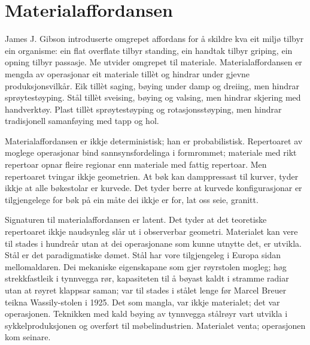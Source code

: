\section*{Materialaffordansen}


James J. Gibson introduserte omgrepet affordans for å skildre kva eit miljø tilbyr ein organisme: ein flat overflate tilbyr standing, ein handtak tilbyr griping, ein opning tilbyr passasje. Me utvider omgrepet til materiale. Materialaffordansen er mengda av operasjonar eit materiale tillèt og hindrar under gjevne produksjonsvilkår. Eik tillèt saging, bøying under damp og dreiing, men hindrar sprøytestøyping. Stål tillèt sveising, bøying og valsing, men hindrar skjering med handverktøy. Plast tillèt sprøytestøyping og rotasjonsstøyping, men hindrar tradisjonell samanføying med tapp og hol.

Materialaffordansen er ikkje deterministisk; han er probabilistisk. Repertoaret av moglege operasjonar bind sannsynsfordelinga i formrommet; materiale med rikt repertoar opnar fleire regionar enn materiale med fattig repertoar. Men repertoaret tvingar ikkje geometrien. At bøk kan damppressast til kurver, tyder ikkje at alle bøkestolar er kurvede. Det tyder berre at kurvede konfigurasjonar er tilgjengelege for bøk på ein måte dei ikkje er for, lat oss seie, granitt.

Signaturen til materialaffordansen er latent. Det tyder at det teoretiske repertoaret ikkje naudsynleg slår ut i observerbar geometri. Materialet kan vere til stades i hundreår utan at dei operasjonane som kunne utnytte det, er utvikla. Stål er det paradigmatiske dømet. Stål har vore tilgjengeleg i Europa sidan mellomaldaren. Dei mekaniske eigenskapane som gjer røyrstolen mogleg; høg strekkfastleik i tynnvegga rør, kapasiteten til å bøyast kaldt i stramme radiar utan at røyret klappsar saman; var til stades i stålet lenge før Marcel Breuer teikna Wassily-stolen i 1925. Det som mangla, var ikkje materialet; det var operasjonen. Teknikken med kald bøying av tynnvegga stålrøyr vart utvikla i sykkelproduksjonen og overført til møbelindustrien. Materialet venta; operasjonen kom seinare.


